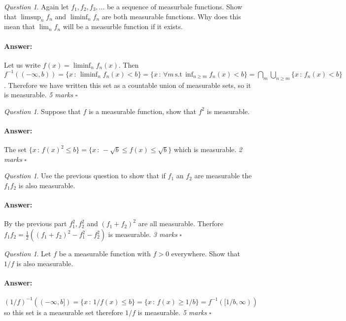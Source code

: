 \documentclass[11pt]{article}
\theoremstyle{definition}
\theoremstyle{remark}
\newtheorem{q}[thm]{Question}
\newenvironment{ans}{\paragraph{Answer:}}{\hfill$\square$ \vspace{20pt}}
\begin{document}
\begin{q}
Again let $f_1, f_2, f_3, \dots$ be a sequence of measurbale functions. Show that $\limsup_n f_n$ and $\liminf_n f_n$ are both measurable functions. Why does this mean that $\lim_n f_n$ will be a measurble function if it exists.
\end{q}
\begin{ans}
Let us write $f(x) = \liminf_n f_n(x)$. Then $f^{-1}((-\infty, b)) = \{ x \,:\, \liminf_n f_n (x) < b\} = \{x \, :\, \forall m \, \mbox{s.t} \, \inf_{n \geq m} f_n(x) < b\} = \bigcap_m \bigcup_{n \geq m} \{ x \, :\, f_n (x) < b\}$. Therefore we have written this set as a countable union of measurable sets, so it is measurable. \emph{5 marks}
\end{ans}

\begin{q}
Suppose that $f$ is a measurable function, show that $f^2$ is measurable.
\end{q}
\begin{ans}
The set $\{ x \,:\, f(x)^2 \leq b\} = \{ x \, :\, -\sqrt{b} \leq f(x) \leq \sqrt{b}\}$ which is measurable.  \emph{2 marks}
\end{ans}

\begin{q}
Use the previous question to show that if $f_1$ an $f_2$ are measurable the $f_1 f_2$ is also measurable. 
\end{q}
\begin{ans}
By the previous part $f_1^2, f_2^2$ and $(f_1+f_2)^2$ are all measurable. Therfore $f_1f_2 = \frac{1}{2}((f_1+f_2)^2 -f_1^2-f_2^2)$ is measurable. \emph{3 marks}
\end{ans}

\begin{q}
Let $f$ be a measurable function with $f >0$ everywhere. Show that $1/f$ is also measurable.
\end{q}

\begin{ans}
$(1/f)^{-1}((-\infty, b]) = \{ x \,:\, 1/f(x) \leq b\} = \{ x \, :\, f(x) \geq 1/b \} = f^{-1}([1/b, \infty))$ so this set is a measurable set therefore $1/f$ is measurable. \emph{5 marks}
\end{ans}
\end{document}
